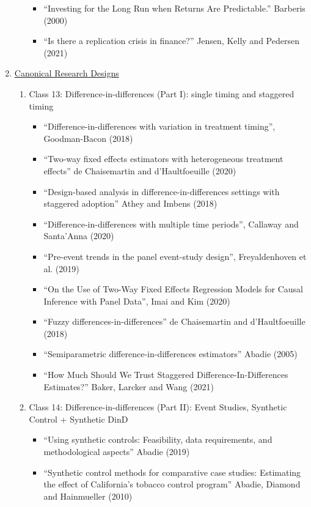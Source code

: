 \documentclass[11pt, a4paper]{article}
\begin{document}
\begin{enumerate}
\begin{enumerate}
\begin{itemize}
    \item ``Investing for the Long Run when Returns Are Predictable.'' Barberis (2000)
    \item ``Is there a replication crisis in finance?'' Jensen, Kelly and Pedersen (2021)
    \end{itemize}
  \end{enumerate}
\item  \underline{Canonical Research Designs}
  \begin{enumerate}
  \item Class 13: Difference-in-differences (Part I): single timing and staggered timing
    \begin{itemize}
    \item ``Difference-in-differences with variation in treatment timing'', Goodman-Bacon (2018)
    \item ``Two-way fixed effects estimators with heterogeneous treatment effects'' de Chaisemartin and d'Haultfoeuille (2020)
    \item ``Design-based analysis in difference-in-differences settings with staggered adoption'' Athey and Imbens (2018)
    \item ``Difference-in-differences with multiple time periods'', Callaway and Santa'Anna (2020)
    \item ``Pre-event trends in the panel event-study design'', Freyaldenhoven et al. (2019)
    \item ``On the Use of Two-Way Fixed Effects Regression Models for Causal Inference with Panel Data'', Imai and Kim (2020)
    \item ``Fuzzy differences-in-differences'' de Chaisemartin and d'Haultfoeuille (2018)
    \item ``Semiparametric difference-in-differences estimators'' Abadie (2005)
    \item ``How Much Should We Trust Staggered Difference-In-Differences Estimates?'' Baker, Larcker and Wang (2021)
    \end{itemize}
  \item Class 14: Difference-in-differences (Part II): Event Studies, Synthetic Control + Synthetic DinD
    \begin{itemize}
    \item ``Using synthetic controls: Feasibility, data requirements, and methodological aspects'' Abadie (2019)
    \item ``Synthetic control methods for comparative case studies: Estimating the effect of California’s tobacco control program'' Abadie, Diamond and Hainmueller (2010)

\end{itemize}
\end{enumerate}
\end{enumerate}
\end{document}

